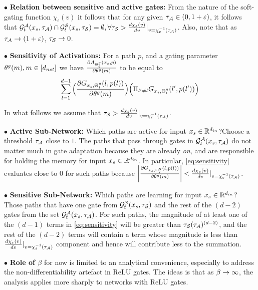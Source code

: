 $\bullet$ \textbf{Relation between sensitive and active gates:} From the nature of the soft-gating function $\chi_{\epsilon}(v)$ it follows that for any given $\tau_{\A}\in(0,1+\epsilon)$, it follows that $\G_t^{\A}(x_s,\tau_{\A})\cap \G_t^{\S}(x_s,\tau_{\S})=\emptyset,\forall \tau_{\S}>\frac{d \chi_{\epsilon}(v)}{d v}|_{v=\chi^{-1}_{\epsilon}(\tau_{\A})}$. Also, note that as $\tau_{\A}\ra (1+\epsilon)$, $\tau_{\S}\ra 0$.

$\bullet$ \textbf{Sensitivity of Activations:} For a path $p$, and a gating parameter $\tg(m),m\in[d_{net}]$ we have $\frac{\partial A_{\Tg_t}(x_s,p)}{\partial \tg(m)}$ to be equal to
\begin{align}\label{eq:sensitivity}
\sum_{l=1}^{d-1} \Big(\frac{\partial G_{x_s,\Tg_t}(l,p(l))}{\partial \tg(m)} \Big)\Big(\Pi_{l'\neq l} G_{x_s,\Tg_t}(l',p(l'))\Big)
\end{align}

In what follows we assume that $\tau_{\S}>\frac{d \chi_{\epsilon}(v)}{d v}|_{v=\chi^{-1}_{\epsilon}(\tau_{\A})}$.

$\bullet$ \textbf{Active Sub-Network:} Which paths are active for input $x_s\in\R^{d_{in}}$?\quad Choose a threshold $\tau_{\A}$ close to $1$. The paths that pass through gates in $\G_t^{\A}(x_s,\tau_{\A})$ do not matter much in gate adaptation because they are already \emph{on}, and are responsible for holding the memory for input $x_s\in\R^{d_{in}}$. In particular, \eqref{eq:sensitivity} evaluates close to $0$ for such paths because $\left|\frac{\partial G_{x_s,\Tg_t}(l,p(l))}{\partial \tg(m)}\right|<\frac{d \chi_{\epsilon}(v)}{d v}|_{v=\chi^{-1}_{\epsilon}(\tau_{\A})}$.

$\bullet$ \textbf{Sensitive Sub-Network:} Which paths are learning for input $x_s\in\R^{d_{in}}$? \quad Those paths that have one gate from $\G^{\S}_t(x_s,\tau_{\S})$ and the rest of the $(d-2)$ gates from the set  $\G^{\A}_t(x_s,\tau_{\A})$. For such paths, the magnitude of at least one of the $(d-1)$ terms in \eqref{eq:sensitivity} will be greater than $\tau_{\S}(\tau_{A})^{(d-2)}$, and the rest of the $(d-2)$ terms will contain a term whose magnitude is less than $\frac{d \chi_{\epsilon}(v)}{d v}|_{v=\chi^{-1}_{\epsilon}(\tau_{\A})}$ component and hence will contribute less to the summation.

$\bullet$ \textbf{Role of $\beta$} for now is limited to an analytical convenience, especially to address the non-differentiability artefact in ReLU gates. The ideas is that as $\beta\ra\infty$, the analysis applies more sharply to networks with ReLU gates.




